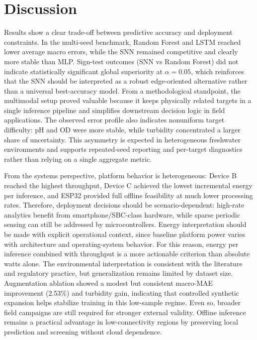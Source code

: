 \section{Discussion}

Results show a clear trade-off between predictive accuracy and deployment constraints. In the multi-seed benchmark, Random Forest and LSTM reached lower average macro errors, while the SNN remained competitive and clearly more stable than MLP. Sign-test outcomes (SNN vs Random Forest) did not indicate statistically significant global superiority at $\alpha=0.05$, which reinforces that the SNN should be interpreted as a robust edge-oriented alternative rather than a universal best-accuracy model. From a methodological standpoint, the multimodal setup proved valuable because it keeps physically related targets in a single inference pipeline and simplifies downstream decision logic in field applications. The observed error profile also indicates nonuniform target difficulty: pH and OD were more stable, while turbidity concentrated a larger share of uncertainty. This asymmetry is expected in heterogeneous freshwater environments and supports repeated-seed reporting and per-target diagnostics rather than relying on a single aggregate metric.

From the systems perspective, platform behavior is heterogeneous: Device B reached the highest throughput, Device C achieved the lowest incremental energy per inference, and ESP32 provided full offline feasibility at much lower processing rates. Therefore, deployment decisions should be scenario-dependent: high-rate analytics benefit from smartphone/SBC-class hardware, while sparse periodic sensing can still be addressed by microcontrollers. Energy interpretation should be made with explicit operational context, since baseline platform power varies with architecture and operating-system behavior. For this reason, energy per inference combined with throughput is a more actionable criterion than absolute watts alone. The environmental interpretation is consistent with the literature and regulatory practice, but generalization remains limited by dataset size. Augmentation ablation showed a modest but consistent macro-MAE improvement (2.53\%) and turbidity gain, indicating that controlled synthetic expansion helps stabilize training in this low-sample regime. Even so, broader field campaigns are still required for stronger external validity. Offline inference remains a practical advantage in low-connectivity regions by preserving local prediction and screening without cloud dependence.

